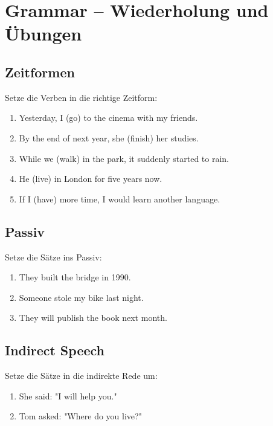 \section{Grammar – Wiederholung und Übungen}

\subsection{Zeitformen}
Setze die Verben in die richtige Zeitform:
\begin{enumerate}
    \item Yesterday, I (go) \underline{\hspace{3cm}} to the cinema with my friends.
    \item By the end of next year, she (finish) \underline{\hspace{3cm}} her studies.
    \item While we (walk) \underline{\hspace{3cm}} in the park, it suddenly started to rain.
    \item He (live) \underline{\hspace{3cm}} in London for five years now.
    \item If I (have) \underline{\hspace{3cm}} more time, I would learn another language.
\end{enumerate}

\subsection{Passiv}
Setze die Sätze ins Passiv:
\begin{enumerate}
    \item They built the bridge in 1990. \\
          \underline{\hspace{3cm}}
    \item Someone stole my bike last night. \\
          \underline{\hspace{3cm}}
    \item They will publish the book next month. \\
          \underline{\hspace{3cm}}
\end{enumerate}

\subsection{Indirect Speech}
Setze die Sätze in die indirekte Rede um:
\begin{enumerate}
    \item She said: "I will help you." \\
          \underline{\hspace{3cm}}
    \item Tom asked: "Where do you live?" \\
          \underline{\hspace{3cm}}
\end{enumerate}

